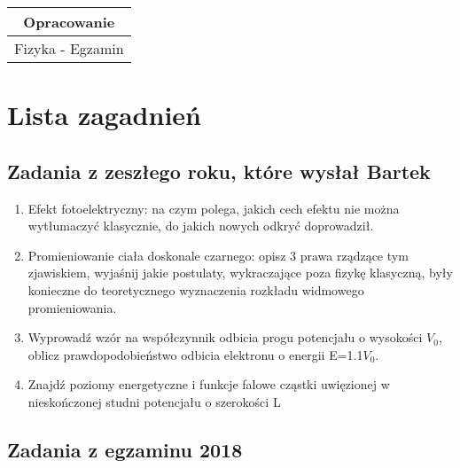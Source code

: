 \documentclass[a4paper,15pt]{article}
\begin{document}
\begin{table}
\begin{center}
\begin{tabular}{|c|c|c|}
\hline
\multicolumn{3}{|c|}{\textbf{Opracowanie}} \\ \hline \multicolumn{3}{|c|}{Fizyka - Egzamin}  \\ \hline
\end{tabular}
\end{center}
\end{table}

\tableofcontents


\newpage

\section{Lista zagadnień}

\subsection{Zadania z zeszłego roku, które wysłał Bartek}

\begin{enumerate}

\item Efekt  fotoelektryczny:  na  czym  polega,  jakich  cech  efektu  nie  można  wytłumaczyć  klasycznie, do jakich nowych odkryć doprowadził.
\item Promieniowanie ciała doskonale czarnego: opisz 3 prawa rządzące tym zjawiskiem, wyjaśnij jakie postulaty, wykraczające poza fizykę klasyczną, były konieczne do teoretycznego wyznaczenia rozkładu widmowego promieniowania.
\item Wyprowadź wzór na współczynnik odbicia progu potencjału o wysokości $V_0$, oblicz prawdopodobieństwo odbicia elektronu o energii E=1.1$V_0$.
\item Znajdź poziomy energetyczne i funkcje falowe cząstki uwięzionej w nieskończonej studni potencjału o szerokości L
\end{enumerate}



\subsection{Zadania z egzaminu 2018}
\end{document}
